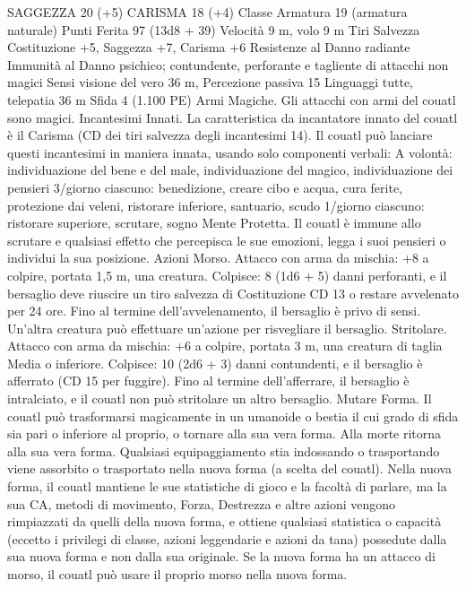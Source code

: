 \begin{multicols}{2}
SAGGEZZA 20 (+5)
CARISMA 18 (+4)
Classe Armatura 19 (armatura naturale)
Punti Ferita 97 (13d8 + 39)
Velocità 9 m, volo 9 m
Tiri Salvezza Costituzione +5, Saggezza +7, Carisma +6
Resistenze al Danno radiante
Immunità al Danno psichico; contundente, perforante e
tagliente di attacchi non magici
Sensi visione del vero 36 m, Percezione passiva 15
Linguaggi tutte, telepatia 36 m
Sfida 4 (1.100 PE)
Armi Magiche. Gli attacchi con armi del couatl sono magici.
Incantesimi Innati. La caratteristica da incantatore innato del
couatl è il Carisma (CD dei tiri salvezza degli incantesimi 14). Il
couatl può lanciare questi incantesimi in maniera innata, usando
solo componenti verbali:
A volontà: individuazione del bene e del male, individuazione del
magico, individuazione dei pensieri
3/giorno ciascuno: benedizione, creare cibo e acqua, cura ferite,
protezione dai veleni, ristorare inferiore, santuario, scudo
1/giorno ciascuno: ristorare superiore, scrutare, sogno
Mente Protetta. Il couatl è immune allo scrutare e qualsiasi
effetto che percepisca le sue emozioni, legga i suoi pensieri o
individui la sua posizione.
Azioni
Morso. Attacco con arma da mischia: +8 a colpire, portata 1,5
m, una creatura.
Colpisce: 8 (1d6 + 5) danni perforanti, e il bersaglio deve
riuscire un tiro salvezza di Costituzione CD 13 o restare
avvelenato per 24 ore. Fino al termine dell’avvelenamento, il
bersaglio è privo di sensi. Un’altra creatura può effettuare
un’azione per risvegliare il bersaglio.
Stritolare. Attacco con arma da mischia: +6 a colpire, portata 3
m, una creatura di taglia Media o inferiore.
Colpisce: 10 (2d6 + 3) danni contundenti, e il bersaglio è afferrato
(CD 15 per fuggire). Fino al termine dell’afferrare, il bersaglio è
intralciato, e il couatl non può stritolare un altro bersaglio.
Mutare Forma. Il couatl può trasformarsi magicamente in un
umanoide o bestia il cui grado di sfida sia pari o inferiore al proprio,
o tornare alla sua vera forma. Alla morte ritorna alla sua vera forma.
Qualsiasi equipaggiamento stia indossando o trasportando viene
assorbito o trasportato nella nuova forma (a scelta del couatl).
Nella nuova forma, il couatl mantiene le sue statistiche di gioco e la
facoltà di parlare, ma la sua CA, metodi di movimento, Forza,
Destrezza e altre azioni vengono rimpiazzati da quelli della nuova
forma, e ottiene qualsiasi statistica o capacità (eccetto i privilegi di
classe, azioni leggendarie e azioni da tana) possedute dalla sua nuova
forma e non dalla sua originale. Se la nuova forma ha un attacco di
morso, il couatl può usare il proprio morso nella nuova forma.

\end{multicols}
